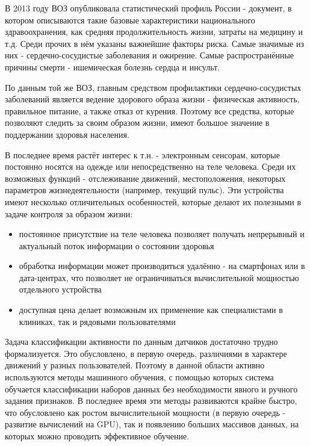 \intro

В 2013 году ВОЗ опубликовала статистический профиль России - документ, в котором описываются такие базовые характеристики национального здравоохранения, как средняя продолжительность жизни, затраты на медицину и т.д\cite{who_russia_profile}. Среди прочих в нём указаны важнейшие факторы риска. Самые значимые из них - сердечно-сосудистые заболевания и ожирение. Самые распространённые причины смерти - ишемическая болезнь сердца и инсульт. 

По данным той же ВОЗ\cite{who_cardiovascular}, главным средством профилактики сердечно-сосудистых заболеваний является ведение здорового образа жизни - физическая активность, правильное питание, а также отказ от курения. Поэтому все средства, которые позволяют следить за своим образом жизни, имеют большое значение в поддержании здоровья населения.

В последнее время растёт интерес к т.н.  - электронным сенсорам, которые постоянно носятся на одежде или непосредственно на теле человека. Среди их возможных функций - отслеживание движений, местоположения, некоторых параметров жизнедеятельности (например, текущий пульс). Эти устройства имеют несколько отличительных особенностей, которые делают их полезными в задаче контроля за образом жизни:
\begin{itemize}
\item постоянное присутствие на теле человека позволяет получать непрерывный и актуальный поток информации о состоянии здоровья
\item обработка информации может производиться удалённо - на смартфонах или в дата-центрах, что позволяет не ограничиваться вычислительной мощностью отдельного устройства
\item доступная цена делает возможным их применение как специалистами в клиниках, так и рядовыми пользователями
\end{itemize}

Задача классификации активности по данным датчиков достаточно трудно формализуется. Это обусловлено, в первую очередь, различиями в характере движений у разных пользователей. Поэтому в данной области активно используются методы машинного обучения, с помощью которых система обучается классификации наборов данных без необходимости явного и ручного задания признаков. В последнее время эти методы развиваются крайне быстро, что обусловлено как ростом вычислительной мощности (в первую очередь - развитие вычислений на GPU), так и появлению больших массивов данных, на которых можно проводить эффективное обучение.

